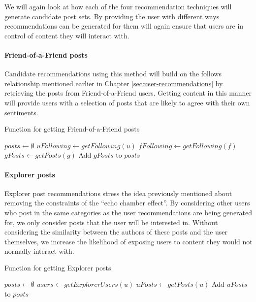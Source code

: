 We will again look at how each of the four recommendation techniques will generate candidate post sets. By providing the user with different ways recommendations can be generated for them will again ensure that users are in control of content they will interact with. 

\paragraph{Friend-of-a-Friend posts} Candidate recommendations using this method will build on the follows relationship mentioned earlier in Chapter \ref{sec:user-recommendations} by retrieving the posts from Friend-of-a-Friend users. Getting content in this manner will provide users with a selection of posts that are likely to agree with their own sentiments. 

\begin{algorithm}
\caption{Function for getting Friend-of-a-Friend posts}
\label{alg:fof-content}
\begin{algorithmic}[1]
	\State $posts\gets \emptyset$
	\State $uFollowing\gets getFollowing(u)$
		\State $fFollowing\gets getFollowing(f)$
			\State $gPosts\gets getPosts(g)$
			\State Add $gPosts$ to $posts$
		\EndFor  
	\EndFor
	\State {}		
\EndFunction
\end{algorithmic}
\end{algorithm}

\paragraph{Explorer posts} Explorer post recommendations stress the idea previously mentioned about removing the constraints of the ``echo chamber effect''. By considering other users who post in the same categories as the user recommendations are being generated for, we only consider posts that the user will be interested in. Without considering the similarity between the authors of these posts and the user themselves, we increase the likelihood of exposing users to content they would not normally interact with.

\begin{algorithm}
\caption{Function for getting Explorer posts}
\label{alg:explorer-content}
\begin{algorithmic}[1]
	\State $posts\gets \emptyset$
	\State $users\gets getExplorerUsers(u)$
		\State $uPosts\gets getPosts(u)$
		\State Add $uPosts$ to $posts$
	\EndFor
	\State {}
\EndFunction
\end{algorithmic}
\end{algorithm}

